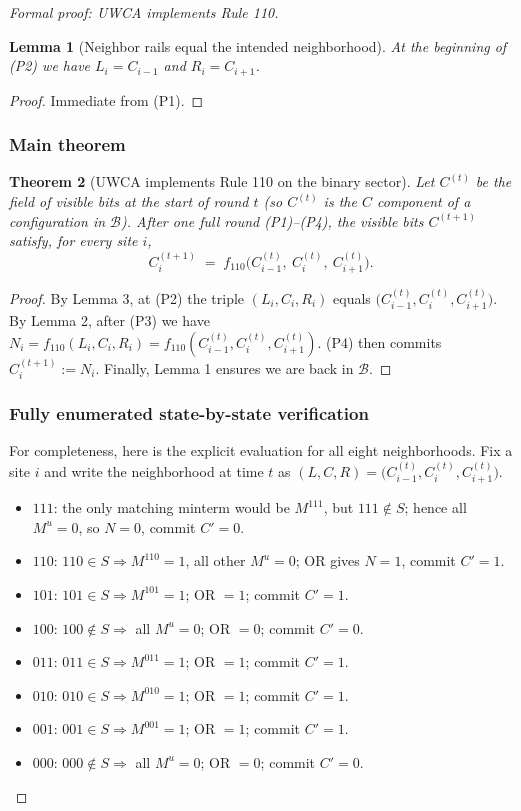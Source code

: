 \documentclass[12pt]{article}
\newtheorem{theorem}{Theorem}[section]
\newtheorem{lemma}[theorem]{Lemma}
\numberwithin{equation}{section}
\begin{document}
\begin{proof}[Formal proof: UWCA implements Rule 110]
\begin{lemma}[Neighbor rails equal the intended neighborhood]
At the beginning of (P2) we have $L_i=C_{i-1}$ and $R_i=C_{i+1}$.
\end{lemma}

\begin{proof}
Immediate from (P1).
\end{proof}

\subsubsection*{Main theorem}

\begin{theorem}[UWCA implements Rule 110 on the binary sector]
Let $C^{(t)}$ be the field of visible bits at the start of round $t$ (so $C^{(t)}$ is the $C$ component of a configuration in $\mathcal B$). After one full round (P1)--(P4), the visible bits $C^{(t+1)}$ satisfy, for every site $i$,
\[
C^{(t+1)}_i \;=\; f_{110}\!\big(C^{(t)}_{i-1},\ C^{(t)}_i,\ C^{(t)}_{i+1}\big).
\]
\end{theorem}

\begin{proof}
By Lemma 3, at (P2) the triple $(L_i,C_i,R_i)$ equals $\big(C^{(t)}_{i-1},C^{(t)}_i,C^{(t)}_{i+1}\big)$. By Lemma 2, after (P3) we have $N_i=f_{110}(L_i,C_i,R_i)=f_{110}(C^{(t)}_{i-1},C^{(t)}_i,C^{(t)}_{i+1})$. (P4) then commits $C^{(t+1)}_i:=N_i$. Finally, Lemma 1 ensures we are back in $\mathcal B$.
\end{proof}

\subsubsection*{Fully enumerated state-by-state verification}

For completeness, here is the explicit evaluation for all eight neighborhoods. Fix a site $i$ and write the neighborhood at time $t$ as $(L,C,R)=\big(C^{(t)}_{i-1},C^{(t)}_i,C^{(t)}_{i+1}\big)$.
\begin{itemize}[leftmargin=1.1em]
  \item $111$: the only matching minterm would be $M^{111}$, but $111\notin S$; hence all $M^u=0$, so $N=0$, commit $C'=0$.
  \item $110$: $110\in S\Rightarrow M^{110}=1$, all other $M^u=0$; OR gives $N=1$, commit $C'=1$.
  \item $101$: $101\in S\Rightarrow M^{101}=1$; OR $=1$; commit $C'=1$.
  \item $100$: $100\notin S\Rightarrow$ all $M^u=0$; OR $=0$; commit $C'=0$.
  \item $011$: $011\in S\Rightarrow M^{011}=1$; OR $=1$; commit $C'=1$.
  \item $010$: $010\in S\Rightarrow M^{010}=1$; OR $=1$; commit $C'=1$.
  \item $001$: $001\in S\Rightarrow M^{001}=1$; OR $=1$; commit $C'=1$.
  \item $000$: $000\notin S\Rightarrow$ all $M^u=0$; OR $=0$; commit $C'=0$.
\end{itemize}


\end{proof}
\end{document}
